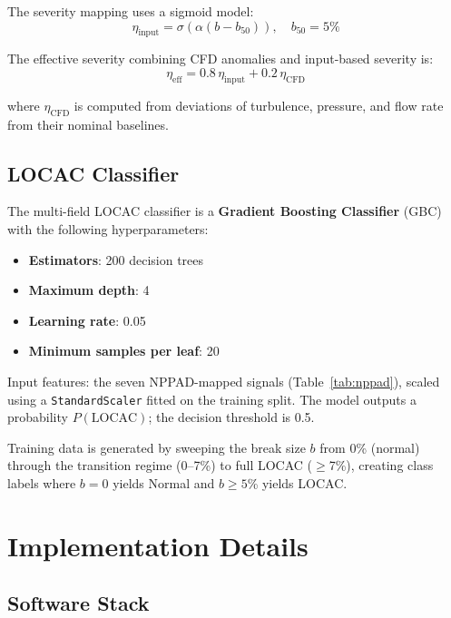 \documentclass[conference]{IEEEtran}
\begin{document}
The severity mapping uses a sigmoid model:
\begin{equation}
\eta_\text{input} = \sigma\!\left(\alpha(b - b_{50})\right), \quad b_{50} = 5\%
\label{eq:severity}
\end{equation}

The effective severity combining CFD anomalies and input-based severity is:
\begin{equation}
\eta_\text{eff} = 0.8\,\eta_\text{input} + 0.2\,\eta_\text{CFD}
\label{eq:eta_eff}
\end{equation}

where $\eta_\text{CFD}$ is computed from deviations of turbulence, pressure, and flow rate from their nominal baselines.

\subsection{LOCAC Classifier}

The multi-field LOCAC classifier is a \textbf{Gradient Boosting Classifier} (GBC) with the following hyperparameters:
\begin{itemize}
    \item \textbf{Estimators}: 200 decision trees
    \item \textbf{Maximum depth}: 4
    \item \textbf{Learning rate}: 0.05
    \item \textbf{Minimum samples per leaf}: 20
\end{itemize}

Input features: the seven NPPAD-mapped signals (Table~\ref{tab:nppad}), scaled using a \texttt{StandardScaler} fitted on the training split. The model outputs a probability $P(\text{LOCAC})$; the decision threshold is 0.5.

Training data is generated by sweeping the break size $b$ from 0\% (normal) through the transition regime (0–7\%) to full LOCAC ($\geq$7\%), creating class labels where $b = 0$ yields Normal and $b \geq 5$\% yields LOCAC.

\section{Implementation Details}
\label{sec:impl}

\subsection{Software Stack}
\end{document}
